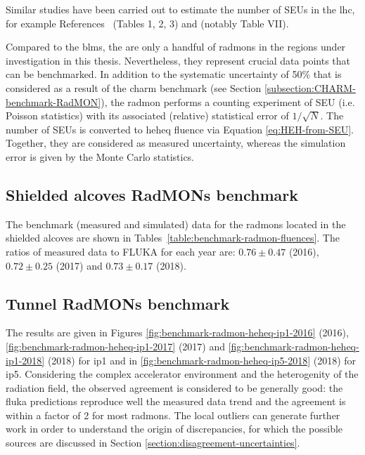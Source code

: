 \documentclass[encoding=utf8,british]{tumphthesis}
\begin{document}
Similar studies have been carried out to estimate the number of SEUs in the \acrshort{lhc}, for example References~\cite{Method-for-Measuring-Mixed-Field-Radiation-Levels-Relevant-for-SEEs-at-the-LHC} (Tables 1, 2, 3) and \cite{FLUKA-Capabilities-and-CERN-Applications-for-R2E} (notably Table VII).

Compared to the \acrshort{blm}s, the are only a handful of \acrshort{radmon}s in the regions under investigation in this thesis. Nevertheless, they represent crucial data points that can be benchmarked. In addition to the systematic uncertainty of 50\% that is considered as a result of the \acrshort{charm} benchmark (see Section \ref{subsection:CHARM-benchmark-RadMON}), the \acrshort{radmon} performs a counting experiment of SEU (i.e. Poisson statistics) with its associated (relative) statistical error of $1/\sqrt{N}$. The number of SEUs is converted to \acrshort{heheq} fluence via Equation \ref{eq:HEH-from-SEU}. Together, they are considered as measured uncertainty, whereas the simulation error is given by the Monte Carlo statistics.


\subsection{Shielded alcoves RadMONs benchmark}

The benchmark (measured and simulated) data for the \acrshort{radmon}s located in the shielded alcoves are shown in Tables~\ref{table:benchmark-radmon-fluences}. The ratios of measured data to FLUKA for each year are: $0.76\pm0.47$ (2016), $0.72\pm0.25$ (2017) and $0.73\pm0.17$ (2018).

\subsection{Tunnel RadMONs benchmark}

 The results are given in Figures \ref{fig:benchmark-radmon-heheq-ip1-2016} (2016), \ref{fig:benchmark-radmon-heheq-ip1-2017} (2017) and \ref{fig:benchmark-radmon-heheq-ip1-2018} (2018) for \acrshort{ip}1 and in \ref{fig:benchmark-radmon-heheq-ip5-2018} (2018) for \acrshort{ip}5. Considering the complex accelerator environment and the heterogenity of the radiation field, the observed agreement is considered to be generally good: the \acrshort{fluka} predictions reproduce well the measured data trend and the agreement is within a factor of 2 for most \acrshort{radmon}s. The local outliers can generate further work in order to understand the origin of discrepancies, for which the possible sources are discussed in Section \ref{section:disagreement-uncertainties}.
\end{document}

